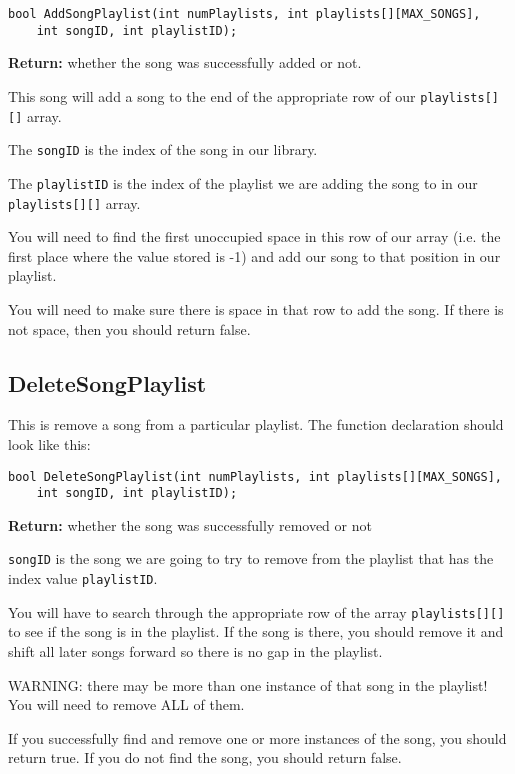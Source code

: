 \begin{verbatim}
bool AddSongPlaylist(int numPlaylists, int playlists[][MAX_SONGS],
    int songID, int playlistID);
\end{verbatim}

\textbf{Return:} whether the song was successfully added or not.

This song will add a song to the end of the appropriate row of our \texttt{playlists[][]} array. 

The \texttt{songID} is the index of the song in our library.

The \texttt{playlistID} is the index of the playlist we are adding the song to in our \texttt{playlists[][]} array.

You will need to find the first unoccupied space in this row of our array (i.e. the first place where the value stored is -1) and add our song to that position in our playlist. 

You will need to make sure there is space in that row to add the song. If there is not space, then you should return false.

\subsection{DeleteSongPlaylist \star \star}
This is remove a song from a particular playlist. The function declaration should look like this:

\begin{verbatim}
bool DeleteSongPlaylist(int numPlaylists, int playlists[][MAX_SONGS], 
    int songID, int playlistID);
\end{verbatim}

\textbf{Return:} whether the song was successfully removed or not

\texttt{songID} is the song we are going to try to remove from the playlist that has the index value \texttt{playlistID}. 

You will have to search through the appropriate row of the array \texttt{playlists[][]} to see if the song is in the playlist. If the song is there, you should remove it and shift all later songs forward so there is no gap in the playlist.

WARNING: there may be more than one instance of that song in the playlist! You will need to remove ALL of them.

If you successfully find and remove one or more instances of the song, you should return true. If you do not find the song, you should return false.

